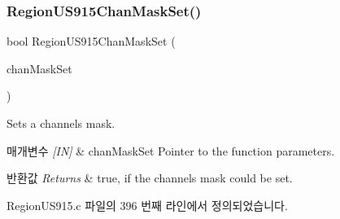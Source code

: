 \subsubsection{\texorpdfstring{Region\+U\+S915\+Chan\+Mask\+Set()}{RegionUS915ChanMaskSet()}}
{\footnotesize\ttfamily bool Region\+U\+S915\+Chan\+Mask\+Set (\begin{DoxyParamCaption}\item[{\mbox{\hyperlink{group___r_e_g_i_o_n_ga6d24f7da136006410827dfb29f6b9b9e}{Chan\+Mask\+Set\+Params\+\_\+t}} $\ast$}]{chan\+Mask\+Set }\end{DoxyParamCaption})}



Sets a channels mask. 


\begin{DoxyParams}{매개변수}
{\em \mbox{[}\+I\+N\mbox{]}} & chan\+Mask\+Set Pointer to the function parameters.\\
\hline
\end{DoxyParams}

\begin{DoxyRetVals}{반환값}
{\em Returns} & true, if the channels mask could be set. \\
\hline
\end{DoxyRetVals}


Region\+U\+S915.\+c 파일의 396 번째 라인에서 정의되었습니다.


